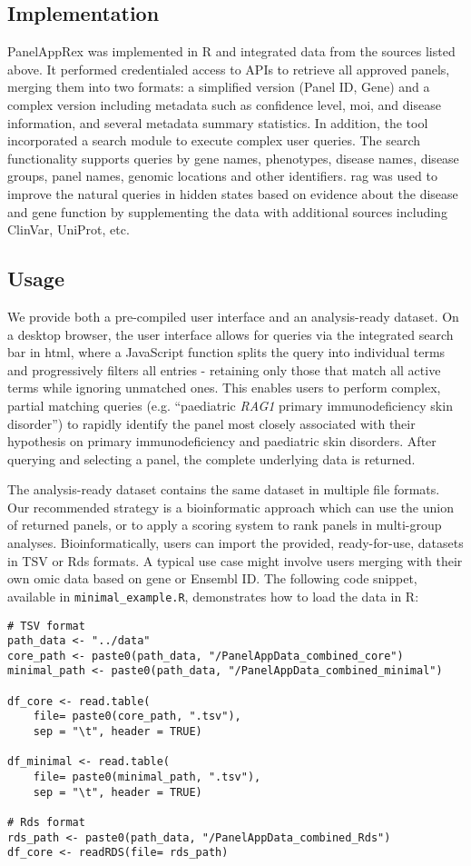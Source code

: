 \subsection{Implementation}
\noindent
PanelAppRex was implemented in R and integrated data from the sources listed above.
It performed credentialed access to APIs to retrieve all approved panels, merging them into two formats: a simplified version (Panel ID, Gene) and a complex version including metadata such as confidence level, \ac{moi}, and disease information, and several metadata summary statistics. In addition, the tool incorporated a search module to execute complex user queries. The search functionality supports queries by gene names, phenotypes, disease names, disease groups, panel names, genomic locations and other identifiers. 
\ac{rag} was used to improve the natural queries in hidden states based on evidence about the disease and gene function by supplementing the data with additional sources including ClinVar, UniProt, etc. 

\subsection{Usage}
\noindent
We provide both a pre-compiled user interface and an analysis-ready dataset.
On a desktop browser, the user interface allows for queries via the integrated search bar in \ac{html}, where a JavaScript function splits the query into individual terms and progressively filters all entries - retaining only those that match all active terms while ignoring unmatched ones. This enables users to perform complex, partial matching queries (e.g. ``paediatric \textit{RAG1} primary immunodeficiency skin disorder'') to rapidly identify the panel most closely associated with their hypothesis on primary immunodeficiency and paediatric skin disorders.
After querying and selecting a panel, the complete underlying data is returned.

The analysis-ready dataset contains the same dataset in multiple file formats.
Our recommended strategy is a bioinformatic approach which can use the union of returned panels, or to apply a scoring system to rank panels in multi-group analyses.
Bioinformatically, users can import the provided, ready-for-use, datasets in TSV or Rds formats.
A typical use case might involve users merging with their own omic data based on gene or Ensembl ID.
The following code snippet, available in \texttt{minimal\_example.R}, demonstrates how to load the data in R:
\begin{verbatim}
# TSV format
path_data <- "../data"
core_path <- paste0(path_data, "/PanelAppData_combined_core")
minimal_path <- paste0(path_data, "/PanelAppData_combined_minimal")

df_core <- read.table(
    file= paste0(core_path, ".tsv"), 
    sep = "\t", header = TRUE)

df_minimal <- read.table(
    file= paste0(minimal_path, ".tsv"), 
    sep = "\t", header = TRUE)

# Rds format
rds_path <- paste0(path_data, "/PanelAppData_combined_Rds")
df_core <- readRDS(file= rds_path)
\end{verbatim}

